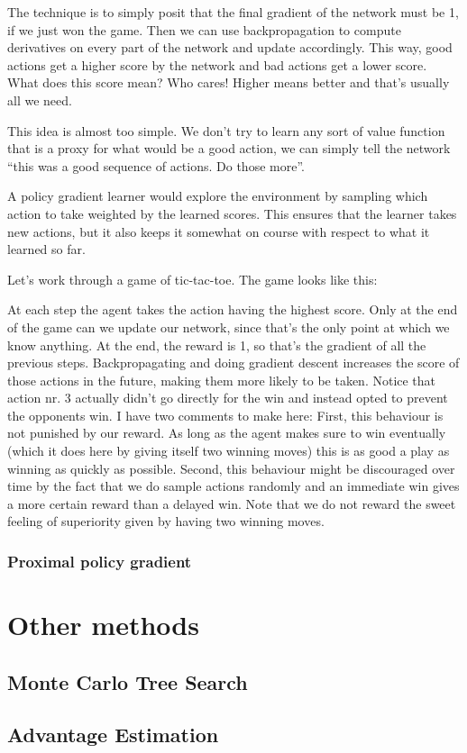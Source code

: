 \documentclass{article}
\theoremstyle{changedot}
\theoremstyle{changedotbreak}
\theoremstyle{nonumberplain}
\begin{document}
The technique is to simply posit that the final gradient of the network must be 1, if we just won the game. Then we can use backpropagation to compute derivatives on every part of the network and update accordingly. This way, good actions get a higher score by the network and bad actions get a lower score. What does this score mean? Who cares! Higher means better and that's usually all we need.

This idea is almost too simple. We don't try to learn any sort of value function that is a proxy for what would be a good action, we can simply tell the network ``this was a good sequence of actions. Do those more''.

A policy gradient learner would explore the environment by sampling which action to take weighted by the learned scores. This ensures that the learner takes new actions, but it also keeps it somewhat on course with respect to what it learned so far.

Let's work through a game of tic-tac-toe. The game looks like this:

At each step the agent takes the action having the highest score. Only at the end of the game can we update our network, since that's the only point at which we know anything. At the end, the reward is 1, so that's the gradient of all the previous steps. Backpropagating and doing gradient descent increases the score of those actions in the future, making them more likely to be taken. Notice that action nr. 3 actually didn't go directly for the win and instead opted to prevent the opponents win. I have two comments to make here: First, this behaviour is not punished by our reward. As long as the agent makes sure to win eventually (which it does here by giving itself two winning moves) this is as good a play as winning as quickly as possible. Second, this behaviour might be discouraged over time by the fact that we do sample actions randomly and an immediate win gives a more certain reward than a delayed win. Note that we do not reward the sweet feeling of superiority given by having two winning moves.

\subsubsection{Proximal policy gradient}

\section{Other methods}

\subsection{Monte Carlo Tree Search}

\subsection{Advantage Estimation}




\end{document}
